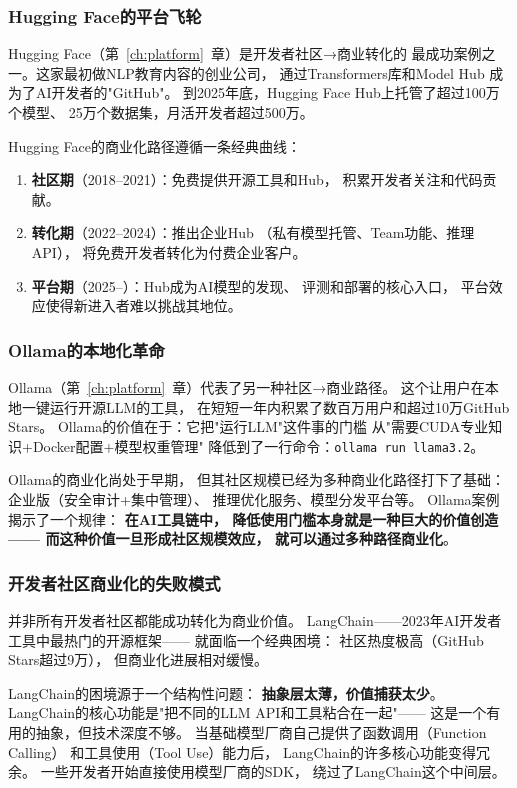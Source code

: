 \subsubsection{Hugging Face的平台飞轮}
Hugging Face（第~\ref{ch:platform}~章）是开发者社区→商业转化的
最成功案例之一。这家最初做NLP教育内容的创业公司，
通过Transformers库和Model Hub
成为了AI开发者的"GitHub"。
到2025年底，Hugging Face Hub上托管了超过100万个模型、
25万个数据集，月活开发者超过500万。

Hugging Face的商业化路径遵循一条经典曲线：
\begin{enumerate}
  \item \textbf{社区期}（2018--2021）：免费提供开源工具和Hub，
    积累开发者关注和代码贡献。
  \item \textbf{转化期}（2022--2024）：推出企业Hub
    （私有模型托管、Team功能、推理API），
    将免费开发者转化为付费企业客户。
  \item \textbf{平台期}（2025--）：Hub成为AI模型的发现、
    评测和部署的核心入口，
    平台效应使得新进入者难以挑战其地位。
\end{enumerate}

\subsubsection{Ollama的本地化革命}
Ollama（第~\ref{ch:platform}~章）代表了另一种社区→商业路径。
这个让用户在本地一键运行开源LLM的工具，
在短短一年内积累了数百万用户和超过10万GitHub Stars。
Ollama的价值在于：它把"运行LLM"这件事的门槛
从"需要CUDA专业知识+Docker配置+模型权重管理"
降低到了一行命令：\texttt{ollama run llama3.2}。

Ollama的商业化尚处于早期，
但其社区规模已经为多种商业化路径打下了基础：
企业版（安全审计+集中管理）、
推理优化服务、模型分发平台等。
Ollama案例揭示了一个规律：
\textbf{在AI工具链中，
降低使用门槛本身就是一种巨大的价值创造——
而这种价值一旦形成社区规模效应，
就可以通过多种路径商业化}。

\subsubsection{开发者社区商业化的失败模式}
并非所有开发者社区都能成功转化为商业价值。
LangChain——2023年AI开发者工具中最热门的开源框架——
就面临一个经典困境：
社区热度极高（GitHub Stars超过9万），
但商业化进展相对缓慢。

LangChain的困境源于一个结构性问题：
\textbf{抽象层太薄，价值捕获太少}。
LangChain的核心功能是"把不同的LLM API和工具粘合在一起"——
这是一个有用的抽象，但技术深度不够。
当基础模型厂商自己提供了函数调用（Function Calling）
和工具使用（Tool Use）能力后，
LangChain的许多核心功能变得冗余。
一些开发者开始直接使用模型厂商的SDK，
绕过了LangChain这个中间层。

